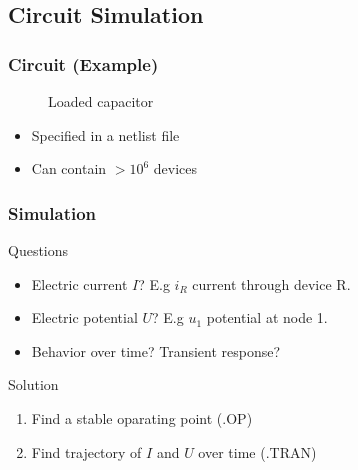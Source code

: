 \subsection{Circuit Simulation}
\begin{frame}
\frametitle{Circuit (Example)}
\begin{figure}[ht]
    \centering\scalebox{1.5}{
        \begin{circuitikz}[scale=1.5]
            
        \end{circuitikz}}
    \caption{Loaded capacitor}
\label{fig:cap}
\end{figure}
\begin{itemize}
    \item Specified in a netlist file
    \item Can contain \(>\!10^6\) devices
\end{itemize}
\end{frame}

\begin{frame}
\frametitle{Simulation}
\begin{block}{Questions}
    \begin{itemize}
        \item Electric current \(I\)? E.g \(i_R\) current through device R.
        \item Electric potential \(U\)? E.g \(u_1\) potential at node 1.
        \item Behavior over time? Transient response?
    \end{itemize}
\end{block}
\begin{block}{Solution}
    \begin{enumerate}
        \item Find a stable oparating point (.OP)
        \item Find trajectory of \(I\) and \(U\) over time (.TRAN)
    \end{enumerate}
\end{block}
\end{frame}

\begin{frame}
    \centering
\end{frame}

